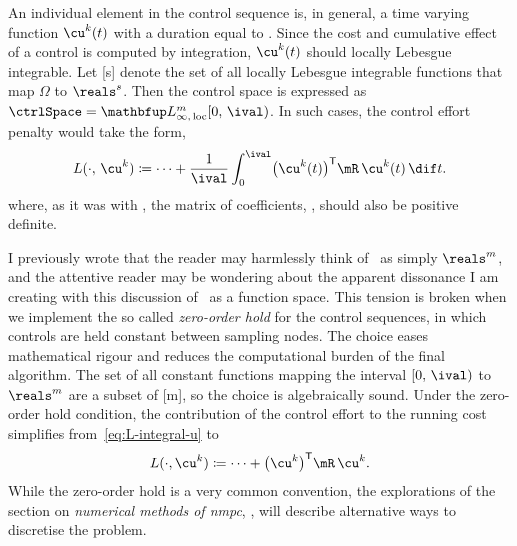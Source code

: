 An individual element in the control sequence is, in general, a time varying
function $\cu^k(t)$ with a duration equal to \ival. Since the cost and
cumulative effect of a control is computed by integration, $\cu^k(t)$ should
locally Lebesgue integrable. Let \lebesgueIntegrable{\Omega}[s] denote the set
of all locally Lebesgue integrable functions that map $\Omega$ to $\reals^s$.
Then the control space is expressed as
$\ctrlSpace = \lebesgueIntegrable{\intco{0}{\ival}}[m]$. In such cases, the
control effort penalty would take the form,
%
\begin{equation}\label{eq:L-integral-u}
  L(\cdot,\,\cu^k) \coloneq \cdots + \frac{1}{\ival}\int_0^{\ival}\bigl(\cu^k(t)\bigr)\tr\mR\,\cu^k(t)\,\dif t.
\end{equation}
%
where, as it was with \mQ, the matrix of coefficients, \mR, should also be
positive definite.

I previously wrote that the reader may harmlessly think of \ctrlSpace\ as simply
$\reals^m$, and the attentive reader may be wondering about the apparent
dissonance I am creating with this discussion of \ctrlSpace\ as a function
space. This tension is broken when we implement the so called \emph{zero-order
hold} for the control sequences, in which controls are
held constant between sampling nodes. The choice eases mathematical rigour and reduces the
computational burden of the final algorithm. The set of all constant functions
mapping the interval $\intco{0}{\ival}$ to $\reals^m$ are a subset of
[m], so the choice is algebraically sound.
Under the zero-order hold condition, the contribution of the control effort to
the running cost simplifies from~\eqref{eq:L-integral-u} to
%
\begin{equation}\label{eq:L-u}
  L(\cdot,\cu^k) \coloneq \cdots + \bigl(\cu^k\bigr)\tr\mR\,\cu^k.
\end{equation}
%
While the zero-order hold is a very common convention, the explorations of the
section on \emph{numerical methods of \ac{nmpc}}, ,
will describe alternative ways to discretise the problem.

\sAsterism

